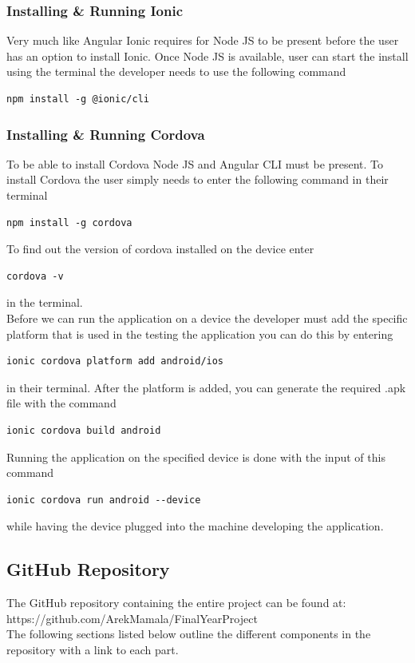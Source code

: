 \documentclass[a4paper,12pt]{report}
\begin{document}
\subsubsection{Installing \& Running Ionic }
Very much like Angular Ionic requires for Node JS to be present before the user has an option to install Ionic.
Once Node JS is available, user can start the install using the terminal the developer needs to use the following command 
\begin{verbatim}
npm install -g @ionic/cli    
\end{verbatim}


\subsubsection{Installing \& Running Cordova }
To be able to install Cordova Node JS and Angular CLI must be present. To install Cordova the user simply needs to enter the following command in their terminal
\begin{verbatim}
npm install -g cordova
\end{verbatim}
To find out the version of cordova installed on the device enter 
\begin{verbatim}
cordova -v
\end{verbatim}
in the terminal.\cite{cordova}\\
\newpage
Before we can run the application on a device the developer must add the specific platform that is used in the testing the application you can do this by entering
\begin{verbatim}
ionic cordova platform add android/ios
\end{verbatim}
in their terminal.
After the platform is added, you can generate the required .apk file with the command 
\begin{verbatim}
ionic cordova build android
\end{verbatim}

Running the application on the specified device is done with the input of this command 
\begin{verbatim}
ionic cordova run android --device   
\end{verbatim} while having the device plugged into the machine developing the application. \cite{cordovaRun}


\subsection{GitHub Repository}
The GitHub repository containing the entire project can be found at:\\ 
https://github.com/ArekMamala/FinalYearProject\\
The following sections listed below outline the different components in the repository with a link to each part.
\end{document}
